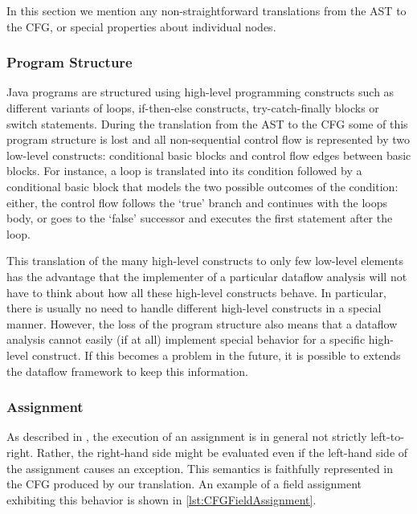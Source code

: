 In this section we mention any non-straightforward translations from the AST to
the CFG, or special properties about individual nodes.


\subsubsection{Program Structure}
\label{sec:prog-structure}

Java programs are structured using high-level programming constructs such as
different variants of loops, if-then-else constructs, try-catch-finally blocks
or switch statements.  During the translation from the AST to the CFG some
of this program structure is lost and all non-sequential control flow is
represented by two low-level constructs: conditional basic blocks and
control flow edges between basic blocks. For instance, a  loop is translated
into its condition followed by a conditional basic block that models the two
possible outcomes of the condition: either, the control flow follows the
`true' branch and continues with the loops body, or goes to the `false'
successor and executes the first statement after the loop.

This translation of the many high-level constructs to only few low-level
elements has the advantage that the implementer of a particular dataflow
analysis will not have to think about how all these high-level constructs
behave. In particular, there is usually no need to handle different high-level
constructs in a special manner. However, the loss of the program structure
also means that a dataflow analysis cannot easily (if at all) implement special behavior
for a specific high-level construct. If this becomes a problem in the future,
it is possible to extends the dataflow framework to keep this information.



\subsubsection{Assignment}

As described in , the execution of an assignment is in general
not strictly left-to-right. Rather, the right-hand side might be evaluated even
if the left-hand side of the assignment causes an exception. This semantics is faithfully
represented in the CFG produced by our translation.
An example of a field assignment exhibiting this behavior is shown in \autoref{lst:CFGFieldAssignment}.



